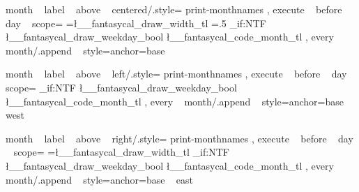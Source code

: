 \tikzset
  {
    month ~ label ~ above ~ centered/.style=
      {
        print-monthnames ,
        execute ~ before ~ day ~ scope=
          {
              {
                {
                  \pgf@xb=\l__fantasycal_draw_width_tl\pgf@xa%
                  \pgf@xb=.5\pgf@xb%
                  \pgftransformxshift{\pgf@xb}
                  \bool_if:NTF \l__fantasycal_draw_weekday_bool
                    {  }
                    {  }
                  \l__fantasycal_code_month_tl
                }
              } 
          }
        ,
        every ~ month/.append ~ style={anchor=base}
      }
  }

\tikzset
  {
    month ~ label ~ above ~ left/.style=
      {
        print-monthnames ,
        execute ~ before ~ day ~ scope=
          {
              {
                {
                  \bool_if:NTF \l__fantasycal_draw_weekday_bool
                    {  }
                    {  }
                  \l__fantasycal_code_month_tl%
                }
              } 
          }
        ,
        every ~ month/.append ~ style={anchor=base ~ west}
      }
  }



\tikzset
  {
    month ~ label ~ above ~ right/.style=
      {
        print-monthnames ,
        execute ~ before ~ day ~ scope=
          {
              {
                {
                  \pgf@xb=\l__fantasycal_draw_width_tl\pgf@xa%
                  \pgftransformxshift{\pgf@xb}
                  \bool_if:NTF \l__fantasycal_draw_weekday_bool
                    {  }
                    {  }
                  \l__fantasycal_code_month_tl%
                }
              } 
          }
        ,
        every ~ month/.append ~ style={anchor=base ~ east}
      }
  }

